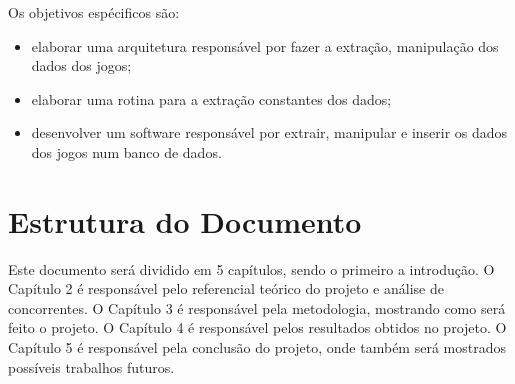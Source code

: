 	Os objetivos espécificos são:
	\begin{itemize}
		\item elaborar uma arquitetura responsável por fazer a extração, manipulação dos dados dos jogos;
		\item elaborar uma rotina para a extração constantes dos dados;
		\item desenvolver um software responsável por extrair, manipular e inserir os dados dos jogos num banco de dados.
	\end{itemize}
\section{Estrutura do Documento}
Este documento será dividido em 5 capítulos, sendo o primeiro a introdução. O Capítulo 2 é responsável pelo referencial teórico do projeto e análise de concorrentes. O Capítulo 3 é responsável pela metodologia, mostrando como será feito o projeto. O Capítulo 4 é responsável pelos resultados obtidos no projeto. O Capítulo 5 é responsável pela conclusão do projeto, onde também será mostrados possíveis trabalhos futuros.